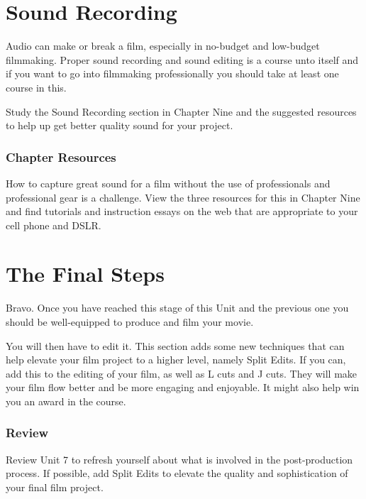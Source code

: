 \documentclass[
]{book}
\begin{document}
\hypertarget{sound-recording}{%
\section*{Sound Recording}\label{sound-recording}}

Audio can make or break a film, especially in no-budget and low-budget filmmaking. Proper sound recording and sound editing is a course unto itself and if you want to go into filmmaking professionally you should take at least one course in this.

Study the Sound Recording section in Chapter Nine and the suggested resources to help up get better quality sound for your project.

\begin{reflect}
\hypertarget{chapter-resources}{%
\subsubsection*{Chapter Resources}\label{chapter-resources}}

How to capture great sound for a film without the use of professionals and professional gear is a challenge. View the three resources for this in Chapter Nine and find tutorials and instruction essays on the web that are appropriate to your cell phone and DSLR.
\end{reflect}

\hypertarget{the-final-steps}{%
\section*{The Final Steps}\label{the-final-steps}}

Bravo. Once you have reached this stage of this Unit and the previous one you should be well-equipped to produce and film your movie.

You will then have to edit it. This section adds some new techniques that can help elevate your film project to a higher level, namely Split Edits. If you can, add this to the editing of your film, as well as L cuts and J cuts. They will make your film flow better and be more engaging and enjoyable. It might also help win you an award in the course.

\begin{reflect}
\hypertarget{review}{%
\subsubsection*{Review}\label{review}}

Review Unit 7 to refresh yourself about what is involved in the post-production process. If possible, add Split Edits to elevate the quality and sophistication of your final film project.
\end{reflect}
\end{document}
